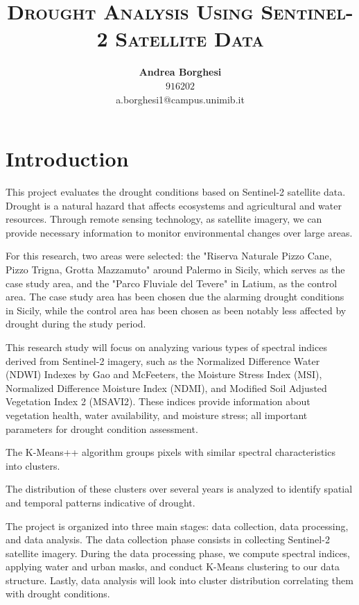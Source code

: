 \documentclass[10pt,twocolumn]{article}
\title{\textbf{\textsc{Drought Analysis Using Sentinel-2 Satellite Data}}}
\author{
  \textbf{Andrea Borghesi} \\
    $916202$ \\
  a.borghesi1@campus.unimib.it
}
\date{}
\begin{document}
\twocolumn[
  \begin{@twocolumnfalse}
    \maketitle
  \end{@twocolumnfalse}
]

\section{Introduction}
This project evaluates the drought conditions based on Sentinel-2 satellite data. Drought is a natural hazard that affects ecosystems and agricultural and water resources. Through remote sensing technology, as satellite imagery, we can provide necessary information to monitor environmental changes over large areas.

For this research, two areas were selected: the "Riserva Naturale Pizzo Cane, Pizzo Trigna, Grotta Mazzamuto" around Palermo in Sicily, which serves as the case study area, and the "Parco Fluviale del Tevere" in Latium, as the control area. The case study area has been chosen due the alarming drought conditions in Sicily, while the control area has been chosen as been notably less affected by drought during the study period.

This research study will focus on analyzing various types of spectral indices derived from Sentinel-2 imagery, such as the Normalized Difference Water (NDWI) Indexes by Gao and McFeeters, the Moisture Stress Index (MSI), Normalized Difference Moisture Index (NDMI), and Modified Soil Adjusted Vegetation Index 2 (MSAVI2). 
These indices provide information about vegetation health, water availability, and moisture stress; all important parameters for drought condition assessment.

The K-Means++ algorithm groups pixels with similar spectral characteristics into clusters. 

The distribution of these clusters over several years is analyzed to identify spatial and temporal patterns indicative of drought.

The project is organized into three main stages: data collection, data processing, and data analysis. The data collection phase consists in collecting Sentinel-2 satellite imagery. During the data processing phase, we compute spectral indices, applying water and urban masks, and conduct K-Means clustering to our data structure. Lastly, data analysis will look into cluster distribution correlating them with drought conditions.
\end{document}
